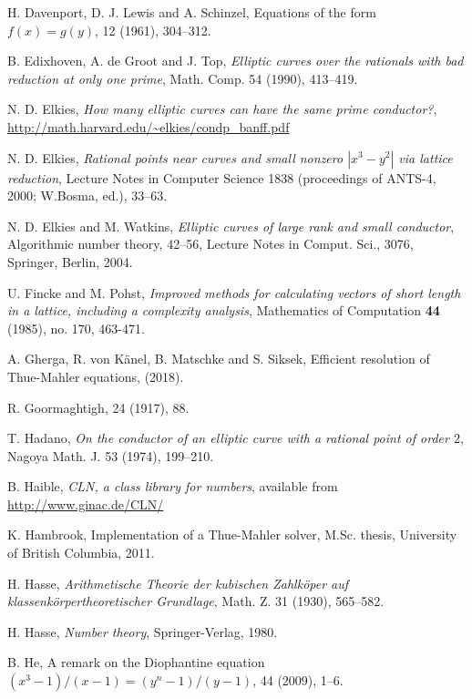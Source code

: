 \begin{thebibliography}{}
H. Davenport, D. J. Lewis and A. Schinzel,
\newblock Equations of the form $f(x)=g(y)$,
 12 (1961), 304--312.

B. Edixhoven, A. de Groot and J. Top,
\emph{Elliptic curves over the rationals with bad reduction at only one prime},
Math. Comp.  54 (1990), 413--419.

N. D. Elkies,
\emph{How many elliptic curves can have the same prime conductor?}, 
\url{http://math.harvard.edu/~elkies/condp_banff.pdf}

N. D. Elkies,
\emph{Rational points near curves and small nonzero $|x^3-y^2|$ via lattice reduction}, 
Lecture Notes in Computer Science 1838 (proceedings of ANTS-4, 2000; W.Bosma, ed.), 33--63.

N. D. Elkies and M. Watkins,
\emph{Elliptic curves of large rank and small conductor},
 Algorithmic number theory, 42--56, Lecture Notes in Comput. Sci., 3076, Springer, Berlin, 2004.

U. Fincke and M. Pohst, 
\emph{Improved methods for calculating vectors of short length in a lattice, including a complexity analysis}, Mathematics of Computation \textbf{44} (1985), no. 170, 463-471.

A. Gherga, R. von K\"{a}nel, B. Matschke and S. Siksek, 
\newblock Efficient resolution of Thue-Mahler equations, 
 (2018).

R. Goormaghtigh,
 24 (1917), 88.

T. Hadano,
\emph{On the conductor of an elliptic curve with a rational point of order $2$},
Nagoya Math. J. 53 (1974), 199--210.

B. Haible, 
\emph{CLN, a class library for 
numbers}, available from \url{http://www.ginac.de/CLN/}

K. Hambrook,
\newblock Implementation of a Thue-Mahler solver,
\newblock M.Sc. thesis, University of British Columbia, 2011.
	
H. Hasse,
\emph{Arithmetische Theorie der kubischen Zahlk\"{o}per auf klassenk\"{o}rpertheoretischer Grundlage},
Math. Z. 31 (1930), 565--582.

H. Hasse, 
\emph{Number theory}, 
Springer-Verlag, 1980.

B. He,
\newblock A remark on the Diophantine equation $(x^3-1)/(x-1)=(y^n-1)/(y-1)$,
 44 (2009), 1--6.


\end{thebibliography}
